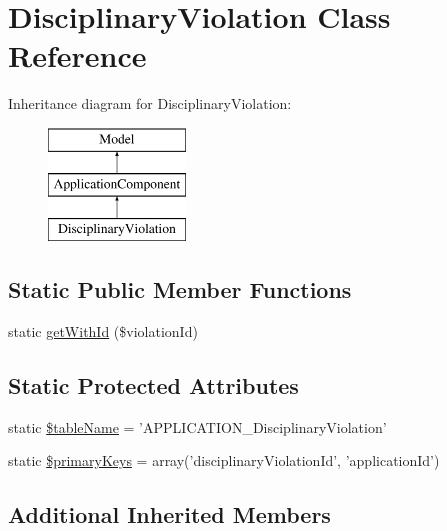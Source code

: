 \hypertarget{class_disciplinary_violation}{\section{Disciplinary\-Violation Class Reference}
\label{class_disciplinary_violation}
}
Inheritance diagram for Disciplinary\-Violation\-:\begin{figure}[H]
\begin{center}
\leavevmode
\includegraphics[height=3.000000cm]{class_disciplinary_violation}
\end{center}
\end{figure}
\subsection*{Static Public Member Functions}
\begin{DoxyCompactItemize}
\item 
static \hyperlink{class_disciplinary_violation_af081f7d1d68e321890da2a682cae0495}{get\-With\-Id} (\$violation\-Id)
\end{DoxyCompactItemize}
\subsection*{Static Protected Attributes}
\begin{DoxyCompactItemize}
\item 
static \hyperlink{class_disciplinary_violation_a63a16ba3da88a65c60d1a2bce19ba410}{\$table\-Name} = 'A\-P\-P\-L\-I\-C\-A\-T\-I\-O\-N\-\_\-\-Disciplinary\-Violation'
\item 
static \hyperlink{class_disciplinary_violation_af798b32ff3ebf1923006244876272cbd}{\$primary\-Keys} = array('disciplinary\-Violation\-Id', 'application\-Id')
\end{DoxyCompactItemize}
\subsection*{Additional Inherited Members}


